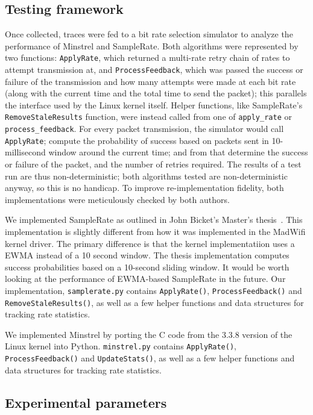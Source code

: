 \documentclass[letterpaper,twocolumn,10pt]{article}
\begin{document}
\subsection{Testing framework}

Once collected, traces were fed to a bit rate selection simulator to analyze the performance of Minstrel and SampleRate.  Both algorithms were represented by two functions: \texttt{ApplyRate}, which returned a multi-rate retry chain of rates to attempt transmission at, and \texttt{ProcessFeedback}, which was passed the success or failure of the transmission and how many attempts were made at each bit rate (along with the current time and the total time to send the packet); this parallels the interface used by the Linux kernel itself.  Helper functions, like SampleRate's \texttt{RemoveStaleResults} function, were instead called from one of \verb|apply_rate| or \verb|process_feedback|.  For every packet transmission, the simulator would call \texttt{ApplyRate}; compute the probability of success based on packets sent in 10-millisecond window around the current time; and from that determine the success or failure of the packet, and the number of retries required.  The results of a test run are thus non-deterministic; both algorithms tested are non-deterministic anyway, so this is no handicap.  To improve re-implementation fidelity, both implementations were meticulously checked by both authors.

We implemented SampleRate as outlined in John Bicket's Master's thesis~\cite{samplerate}. This implementation is slightly different from how it was implemented in the MadWifi kernel driver. The primary difference is that the kernel implementatiion uses a EWMA instead of a 10 second window. The thesis implementation computes success probabilities based on a 10-second sliding window. It would be worth looking at the performance of EWMA-based SampleRate in the future.  Our implementation, \texttt{samplerate.py} contains \texttt{ApplyRate()}, \texttt{ProcessFeedback()} and  \texttt{RemoveStaleResults()}, as well as a few helper functions and data structures for tracking rate statistics. 

We implemented Minstrel by porting the C code from the 3.3.8 version of the Linux kernel into Python. \texttt{minstrel.py} contains \texttt{ApplyRate()}, \texttt{ProcessFeedback()} and  \texttt{UpdateStats()}, as well as a few helper functions and data structures for tracking rate statistics. 



\subsection{Experimental parameters}
\end{document}

